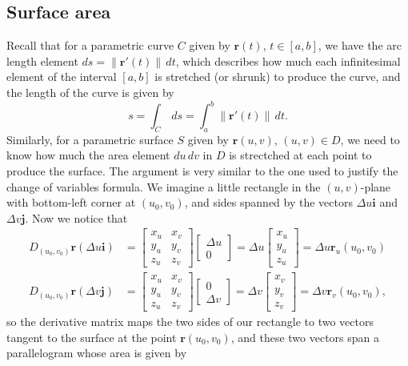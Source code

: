 \documentclass[12pt,letterpaper]{article}
\renewcommand{\r}{\mathbf{r}}
\renewcommand{\i}{\mathbf{i}}
\renewcommand{\j}{\mathbf{j}}
\newcommand{\len}[1]{\left\lVert #1\right\rVert}
\begin{document}
\subsection{Surface area}
Recall that for a parametric curve $C$ given by $\r(t)$, $t\in [a,b]$, we have the arc length element $ds = \len{\r'(t)}\,dt$, which describes how much each infinitesimal element of the interval $[a,b]$ is stretched (or shrunk) to produce the curve, and the length of the curve is given by
\[
 s = \int_C\,ds = \int_a^b\len{\r'(t)}\,dt.
\]
Similarly, for a parametric surface $S$ given by $\r(u,v)$, $(u,v)\in D$, we need to know how much the area element $du\,dv$ in $D$ is strectched at each point to produce the surface. The argument is very similar to the one used to justify the change of variables formula. We imagine a little rectangle in the $(u,v)$-plane with bottom-left corner at $(u_0,v_0)$, and sides spanned by the vectors $\Delta u\i$ and $\Delta v\j$. Now we notice that
\begin{align*}
 D_{(u_0,v_0)}\r(\Delta u\i) &= \begin{bmatrix} x_u & x_v\\y_u&y_v\\z_u&z_v\end{bmatrix}\begin{bmatrix}\Delta u\\0\end{bmatrix} = \Delta u\begin{bmatrix}x_u\\y_u\\z_u\end{bmatrix} = \Delta u\r_u(u_0,v_0)\\
 D_{(u_0,v_0)}\r(\Delta v\j) &= \begin{bmatrix} x_u & x_v\\y_u&y_v\\z_u&z_v\end{bmatrix}\begin{bmatrix}0\\ \Delta v\end{bmatrix} = \Delta v\begin{bmatrix}x_v\\y_v\\z_v\end{bmatrix} = \Delta v\r_v(u_0,v_0),
\end{align*}
so the derivative matrix maps the two sides of our rectangle to two vectors tangent to the surface at the point $\r(u_0,v_0)$, and these two vectors span a parallelogram whose area is given by
\end{document}
